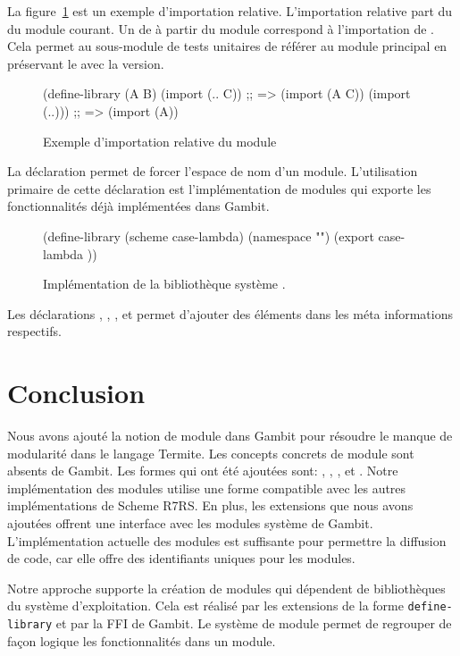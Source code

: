 La figure~\ref{fig:relative-import} est un exemple d'importation relative.
L'importation relative part du  du module courant.  Un
 de  à partir du module 
correspond à l'importation de . Cela permet au sous-module de
tests unitaires de référer au module principal en préservant le
 avec la version. \\

\begin{figure}[ht]
  \centering
  \begin{mplisting}{0.8}
(define-library (A B)
  (import (.. C))  ;; => (import (A C))
  (import (..))) ;; => (import (A))
\end{mplisting}
  \caption{Exemple d'importation relative du module}
  \label{fig:relative-import}
\end{figure}

La déclaration  permet de forcer l'espace de nom d'un module.
L'utilisation primaire de cette déclaration est l'implémentation de modules qui
exporte les fonctionnalités déjà implémentées dans Gambit. \\

\begin{figure}[ht]
  \begin{mplisting}{0.8}
(define-library (scheme case-lambda)
  (namespace "")
  (export
case-lambda
))
\end{mplisting}
  \caption{Implémentation de la bibliothèque système .}
  \label{fig:module->scheme/case-lambda}
\end{figure}

Les déclarations , , ,
 et  permet d'ajouter des éléments dans les
méta informations respectifs.

\section{Conclusion}

Nous avons ajouté la notion de module dans Gambit pour résoudre le manque de
modularité dans le langage Termite.  Les concepts concrets de module sont absents
de Gambit. Les formes qui ont été ajoutées sont: ,
, ,  et
.  Notre implémentation des modules utilise une forme
compatible avec les autres implémentations de Scheme R7RS. En plus, les
extensions que nous avons ajoutées offrent une interface avec les modules
système de Gambit. L'implémentation actuelle des modules est suffisante pour
permettre la diffusion de code, car elle offre des identifiants uniques pour
les modules.

Notre approche supporte la création de modules qui dépendent de bibliothèques
du système d'exploitation.  Cela est réalisé par les extensions de la forme
\texttt{define-library} et par la FFI de Gambit. Le système de module permet
de regrouper de façon logique les fonctionnalités dans un module.
